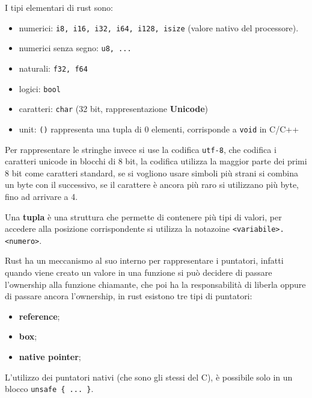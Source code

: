 \documentclass[12pt]{article}
\begin{document}
I tipi elementari di rust sono:
\begin{itemize}
  \item numerici: \texttt{i8, i16, i32, i64, i128, isize} (valore nativo del processore).
  \item numerici senza segno: \texttt{u8, ...}
  \item naturali: \texttt{f32, f64}
  \item logici: \texttt{bool}
  \item caratteri: \texttt{char} (32 bit, rappresentazione \textbf{Unicode})
  \item unit: \texttt{()} rappresenta una tupla di 0 elementi, corrisponde a \texttt{void} in C/C++
\end{itemize}
Per rappresentare le stringhe invece si use la codifica \texttt{utf-8}, che codifica i caratteri unicode in blocchi di 8 bit, la codifica utilizza la maggior parte dei primi 8 bit come caratteri standard, se si vogliono usare simboli pi\`u strani si combina un byte con il successivo, se il carattere \`e ancora pi\`u raro si utilizzano pi\`u byte, fino ad arrivare a 4. 

\hfill

Una \textbf{tupla} \`e una struttura che permette di contenere pi\`u tipi di valori, per accedere alla posizione corrispondente si utilizza la notazoine \texttt{<variabile>.<numero>}.

\hfill

Rust ha un meccanismo al suo interno per rappresentare i puntatori, infatti quando viene creato un valore in una funzione si pu\`o decidere di passare l'ownership alla funzione chiamante, che poi ha la responsabilit\`a di liberla oppure di passare ancora l'ownership, in rust esistono tre tipi di puntatori:
\begin{itemize}
  \item \textbf{reference};
  \item \textbf{box};
  \item \textbf{native pointer};
\end{itemize}
L'utilizzo dei puntatori nativi (che sono gli stessi del C), \`e possibile solo in un blocco \verb|unsafe { ... }|.
\end{document}
